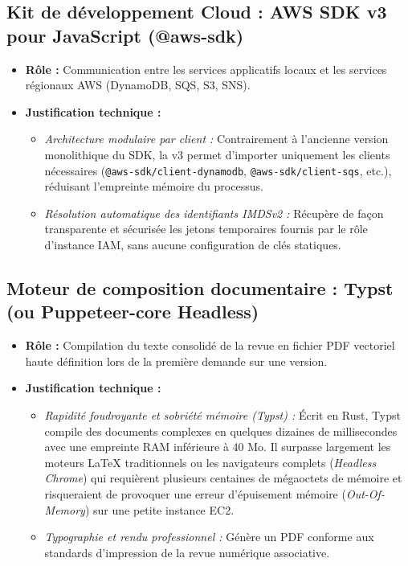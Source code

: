 \subsection{Kit de développement Cloud : AWS SDK v3 pour JavaScript (@aws-sdk)}
\begin{itemize}
    \item \textbf{Rôle :} Communication entre les services applicatifs locaux et les services régionaux AWS (DynamoDB, SQS, S3, SNS).
    \item \textbf{Justification technique :} 
    \begin{itemize}
        \item \emph{Architecture modulaire par client :} Contrairement à l'ancienne version monolithique du SDK, la v3 permet d'importer uniquement les clients nécessaires (\texttt{@aws-sdk/client-dynamodb}, \texttt{@aws-sdk/client-sqs}, etc.), réduisant l'empreinte mémoire du processus.
        \item \emph{Résolution automatique des identifiants IMDSv2 :} Récupère de façon transparente et sécurisée les jetons temporaires fournis par le rôle d'instance IAM, sans aucune configuration de clés statiques.
    \end{itemize}
\end{itemize}

\subsection{Moteur de composition documentaire : Typst (ou Puppeteer-core Headless)}
\begin{itemize}
    \item \textbf{Rôle :} Compilation du texte consolidé de la revue en fichier PDF vectoriel haute définition lors de la première demande sur une version.
    \item \textbf{Justification technique :} 
    \begin{itemize}
        \item \emph{Rapidité foudroyante et sobriété mémoire (Typst) :} Écrit en Rust, Typst compile des documents complexes en quelques dizaines de millisecondes avec une empreinte RAM inférieure à 40 Mo. Il surpasse largement les moteurs LaTeX traditionnels ou les navigateurs complets (\emph{Headless Chrome}) qui requièrent plusieurs centaines de mégaoctets de mémoire et risqueraient de provoquer une erreur d'épuisement mémoire (\emph{Out-Of-Memory}) sur une petite instance EC2.
        \item \emph{Typographie et rendu professionnel :} Génère un PDF conforme aux standards d'impression de la revue numérique associative.
    \end{itemize}
\end{itemize}

